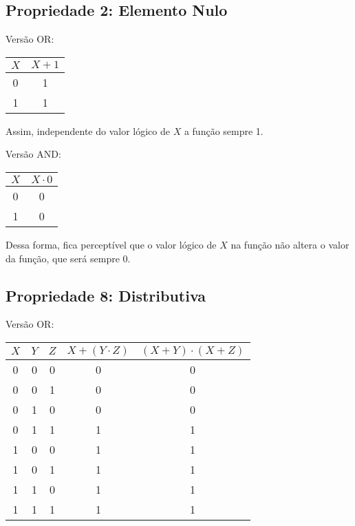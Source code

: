 \documentclass[12pt]{article}
\begin{document}
\subsection{Propriedade 2: Elemento Nulo}

Versão OR:
\begin{center}
\begin{tabular}{|c|c|}
\hline
$X$  & $X + 1$ \\
\hline
0 & 1 \\
1 & 1 \\
\hline
\end{tabular}
\end{center}

Assim, independente do valor lógico de $X$ a função sempre 1.

Versão AND: 
\begin{center}
\begin{tabular}{|c|c|}
\hline
$X$  & $X \cdot 0$ \\
\hline
0 & 0 \\
1 & 0 \\
\hline
\end{tabular}
\end{center}

Dessa forma, fica perceptível que o valor lógico de $X$ na função não altera o valor da função, que será sempre 0.

\subsection{Propriedade 8: Distributiva}

Versão OR:
\begin{center}
\begin{tabular}{|c|c|c|c|c|}
\hline
$X$  & $Y$ & $Z$ & $X + (Y \cdot Z)$ & $(X + Y) \cdot (X + Z)$ \\
\hline
0 & 0 & 0 & 0 & 0 \\
0 & 0 & 1 & 0 & 0 \\
0 & 1 & 0 & 0 & 0 \\
0 & 1 & 1 & 1 & 1 \\
1 & 0 & 0 & 1 & 1 \\
1 & 0 & 1 & 1 & 1 \\
1 & 1 & 0 & 1 & 1 \\
1 & 1 & 1 & 1 & 1 \\
\hline 
\end{tabular}
\end{center}
\end{document}

